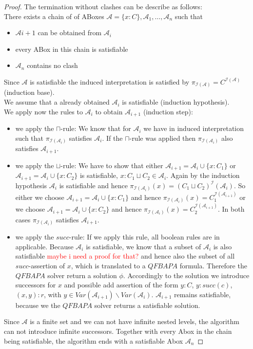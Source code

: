 \documentclass[a4paper,11pt]{scrartcl}
\theoremstyle{break}
\theoremstyle{definition}
\begin{document}
\begin{proof}
The termination without clashes can be describe as follows:\\
There exists a chain of of ABoxes $\mathcal{A}=\{x:C\},\mathcal{A}_1,\dots,\mathcal{A}_n$ such that
\begin{itemize}
\item $\mathcal{A}{i+1}$ can be obtained from $\mathcal{A}_i$
\item every ABox in this chain is satisfiable
\item $\mathcal{A}_n$ contains no clash
\end{itemize}
Since $\mathcal{A}$ is satisfiable the induced interpretation is satisfied by $\pi_{\mathcal{I}(\mathcal{A})}=C^{\mathcal{I}(\mathcal{A})}$ (induction base).\\
We assume that a already obtained $\mathcal{A}_i$ is satisfiable (induction hypothesis).\\
We apply now the rules to $\mathcal{A}_i$ to obtain $\mathcal{A}_{i+1}$ (induction step):
\begin{itemize}
\item we apply the $\sqcap$-rule: We know that for $\mathcal{A}_i$ we have in induced interpretation such that $\pi_{\mathcal{I}(\mathcal{A}_i)}$ satisfies $\mathcal{A}_i$. If the $\sqcap$-rule was applied then $\pi_{\mathcal{I}(\mathcal{A}_i)}$ also satisfies $\mathcal{A}_{i+1}$.
\item we apply the $\sqcup$-rule: We have to show that either $\mathcal{A}_{i+1}=\mathcal{A}_i\cup\{x:C_1\}$ or $\mathcal{A}_{i+1}=\mathcal{A}_i\cup\{x:C_2\}$ is satisfiable, $x:C_1\sqcup C_2\in\mathcal{A}_i$. Again by the induction hypothesis $\mathcal{A}_i$ is satisfiable and hence $\pi_{\mathcal{I}(\mathcal{A}_i)}(x)=(C_1\sqcup C_2)^\mathcal{I}(\mathcal{A}_i)$. So either we choose $\mathcal{A}_{i+1}=\mathcal{A}_i\cup\{x:C_1\}$ and hence $\pi_{\mathcal{I}(\mathcal{A}_i)}(x)=C_1^{\mathcal{I}(\mathcal{A}_{i+1})}$ or we choose $\mathcal{A}_{i+1}=\mathcal{A}_i\cup\{x:C_2\}$ and hence $\pi_{\mathcal{I}(\mathcal{A}_i)}(x)=C_2^{\mathcal{I}(\mathcal{A}_{i+1})}$. In both cases $\pi_{\mathcal{I}(\mathcal{A}_i)}$ satisfies $\mathcal{A}_{i+1}$.
\item we apply the $succ$-rule: If we apply this rule, all boolean rules are in applicable. Because $\mathcal{A}_i$ is satisfiable, we know that a subset of $\mathcal{A}_i$ is also satisfiable \textcolor{red}{maybe i need a proof for that?} and hence also the subset of all $succ$-assertion of $x$, which is translated to a $QFBAPA$ formula. Therefore the $QFBAPA$ solver return a solution $\phi$. Accordingly to the solution we introduce successors for $x$ and possible add assertion of the form $y:C$, $y:succ(c)$, $(x,y):r$, with $y\in Var(\mathcal{A}_{i+1})\backslash Var(\mathcal{A}_i)$. $\mathcal{A}_{i+1}$ remains satisfiable, because we the $QFBAPA$ solver returns a satisfiable solution.
\end{itemize}
Since $\mathcal{A}$ is a finite set and we can not have infinite nested levels, the algorithm can not introduce infinite successors. Together with every Abox in the chain being satisfiable, the algorithm ends with a satisfiable Abox $\mathcal{A}_n$
\end{proof}
\normalem


\end{document}

